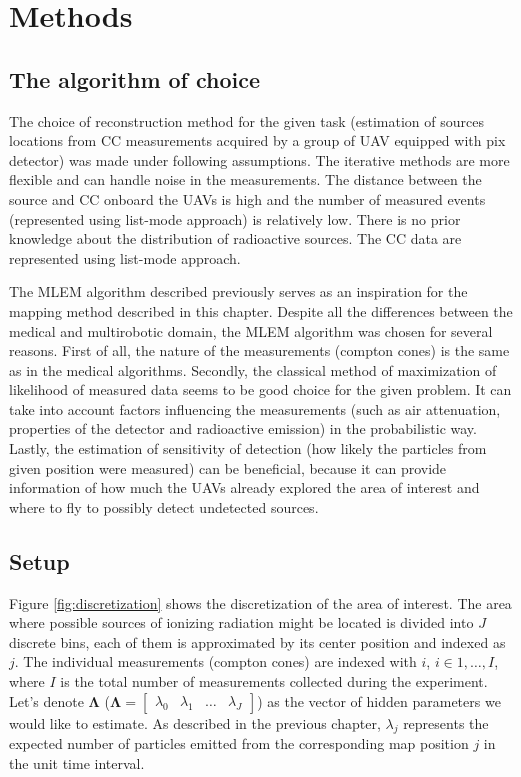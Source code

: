 \chapter{Methods}

\section{The algorithm of choice}
The choice of reconstruction method for the given task (estimation of sources locations from \ac{CC} measurements acquired by a group of \ac{UAV} equipped with \ac{pix} detector) was made under following assumptions.
The iterative methods are more flexible and can handle noise in the measurements.
The distance between the source and \ac{CC} onboard the \ac{UAV}s is high and the number of measured events (represented using list-mode approach) is relatively low.
There is no prior knowledge about the distribution of radioactive sources.
The \ac{CC} data are represented using list-mode approach.


The \ac{MLEM} algorithm described previously serves as an inspiration for the mapping method described in this chapter.
Despite all the differences between the medical and multirobotic domain, the \ac{MLEM} algorithm was chosen for several reasons.
First of all, the nature of the measurements (compton cones) is the same as in the medical algorithms.
Secondly, the classical method of maximization of likelihood of measured data seems to be good choice for the given problem.
It can take into account factors influencing the measurements (such as air attenuation, properties of the detector and radioactive emission) in the probabilistic way.
Lastly, the estimation of sensitivity of detection (how likely the particles from given position were measured) can be beneficial, 
because it can provide information of how much the \ac{UAV}s already explored the area of interest and where to fly to possibly detect undetected sources.

\section{Setup}
Figure \ref{fig:discretization} shows the discretization of the area of interest.
The area where possible sources of ionizing radiation might be located is divided into $J$ discrete bins, each of them is approximated by its center position and indexed as $j$.
The individual measurements (compton cones) are indexed with $i$, $i \in 1, \dots , I$, where $I$ is the total number of measurements collected during the experiment.
Let's denote $\mathbf{\Lambda}$ ($\mathbf{\Lambda} = \begin{bmatrix}\lambda_{0} & \lambda_{1} & \dots & \lambda_{J}\end{bmatrix}$) as the vector of hidden parameters we would like to estimate.
As described in the previous chapter, $\lambda_{j}$ represents the expected number of particles emitted from the corresponding map position $j$ in the unit time interval.

